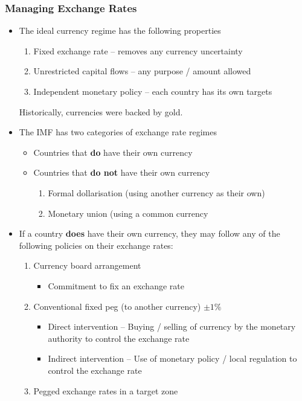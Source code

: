 \documentclass[../notes_compiled.tex]{subfiles}
\begin{document}
\subsubsection{Managing Exchange Rates}
\begin{itemize}
\item The ideal currency regime has the following properties
\begin{enumerate}
\item Fixed exchange rate -- removes any currency uncertainty
\item Unrestricted capital flows -- any purpose / amount allowed
\item Independent monetary policy -- each country has its own targets
\end{enumerate}
Historically, currencies were backed by gold.
\item The IMF has two categories of exchange rate regimes
\begin{itemize}
\item Countries that \textbf{do} have their own currency
\item Countries that \textbf{do not} have their own currency
\begin{enumerate}
\item Formal dollarisation (using another currency as their own)
\item Monetary union (using a common currency
\end{enumerate}
\end{itemize}
\item If a country \textbf{does} have their own currency, they may follow any of the following policies on their exchange rates:
\begin{enumerate}
\item Currency board arrangement
\begin{itemize}
\item Commitment to fix an exchange rate
\end{itemize}
\item Conventional fixed peg (to another currency) $\pm1\%$
\begin{itemize}
\item Direct intervention -- Buying / selling of currency by the monetary authority to control the exchange rate
\item Indirect intervention -- Use of monetary policy / local regulation to control the exchange rate
\end{itemize}
\item Pegged exchange rates in a target zone

\end{enumerate}
\end{itemize}
\end{document}
